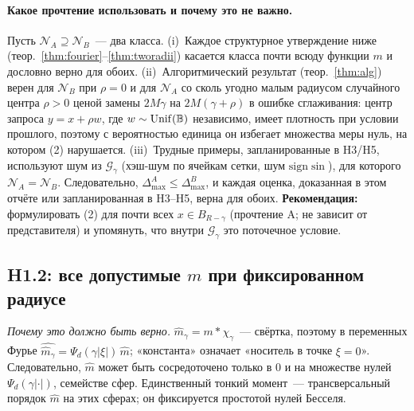 \documentclass[11pt,a4paper]{article}
\numberwithin{equation}{section}
\theoremstyle{definition}
\theoremstyle{remark}
\newcommand{\Dmax}{\Delta_{\max}}\newcommand{\Dcp}{\Delta_{\rm cp}}
\newcommand{\cN}{\mathcal N}\newcommand{\cG}{\mathcal G}\newcommand{\cF}{\mathcal F}\newcommand{\cS}{\mathcal S}
\newcommand{\Unif}{\mathrm{Unif}}\newcommand{\TV}{\mathrm{TV}}\newcommand{\tmix}{t_{\rm mix}}
\begin{document}
\paragraph{Какое прочтение использовать и почему это не важно.}
Пусть $\cN_A\supseteq\cN_B$~--- два класса. (i)~Каждое структурное утверждение ниже (теор.~\ref{thm:fourier}--\ref{thm:tworadii}) касается класса почти всюду функции $m$ и дословно верно для обоих. (ii)~Алгоритмический результат (теор.~\ref{thm:alg}) верен для $\cN_B$ при $\rho=0$ и для $\cN_A$ со сколь угодно малым радиусом случайного центра $\rho>0$ ценой замены $2M\gamma$ на $2M(\gamma+\rho)$ в ошибке сглаживания: центр запроса $y=x+\rho w$, где $w\sim\Unif(\Ball)$ независимо, имеет плотность при условии прошлого, поэтому с вероятностью единица он избегает множества меры нуль, на котором (2) нарушается. (iii)~Трудные примеры, запланированные в H3/H5, используют шум из $\cG_\gamma$ (хэш-шум по ячейкам сетки, шум $\mathrm{sign}\sin$), для которого $\cN_A=\cN_B$. Следовательно, $\Dmax^A\le\Dmax^B$, и каждая оценка, доказанная в этом отчёте или запланированная в H3--H5, верна для обоих.
\textbf{Рекомендация:} формулировать (2) для почти всех $x\in B_{R-\gamma}$ (прочтение A; не зависит от представителя) и упомянуть, что внутри $\cG_\gamma$ это поточечное условие.

\subsection{H1.2: все допустимые $m$ при фиксированном радиусе}
\emph{Почему это должно быть верно.} $\hat m_\gamma=m*\chi_\gamma$~--- свёртка, поэтому в переменных Фурье $\widehat{\hat m_\gamma}=\Psi_d(\gamma|\xi|)\,\hat m$; «константа» означает «носитель в точке $\xi=0$». Следовательно, $\hat m$ может быть сосредоточено только в $0$ и на множестве нулей $\Psi_d(\gamma|\cdot|)$, семействе сфер. Единственный тонкий момент~--- трансверсальный порядок $\hat m$ на этих сферах; он фиксируется простотой нулей Бесселя.
\end{document}
